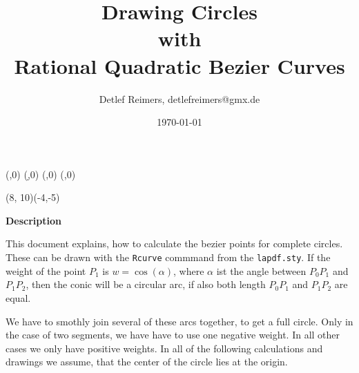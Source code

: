 

\Defdim(\a,0)
\Defdim(\d,0)
\Defdim(\x,0)
\Defdim(\y,0)

\def\Ncirc(#1){\Rad(#1,\a)
 \Cos(\Np\a,\x) \Add(\x,\x)
 \Sin(\Np\a,\y) \Add(\y,\y)
 \Circle(64)(\Np\x,\Np\y,2) \Stroke}

\def\ctitle#1{{\huge\bf{#1}}}

\title{\Huge \bf{Drawing Circles \\
       with \\
       Rational Quadratic Bezier Curves}}
\author{Detlef Reimers, detlefreimers@gmx.de}
\date{\today}


\maketitle

\begin{center}
\begin{lapdf}(8, 10)(-4,-5)
 \Whiledim{\d<360}{\Nextcol(0,23) \Ncirc(\Np\d) \Dadd(\d,15)}
\end{lapdf}

\ctitle{Description}
\end{center}
This document explains, how to calculate the bezier points for
complete circles. These can be drawn with the \texttt{Rcurve}
commmand from the \texttt{lapdf.sty}. If the weight of the point
$P_1$ is $w=\cos(\alpha)$, where $\alpha$ ist the angle between
$P_{0}P_{1}$ and $P_{1}P_{2}$, then the conic will be a circular
arc, if also both length $P_{0}P_{1}$ and $P_{1}P_{2}$ are equal.

We have to smothly join several of these arcs together, to get
a full circle. Only in the case of two segments, we have have to
use one negative weight. In all other cases we only have positive
weights. In all of the following calculations and drawings we assume,
that the center of the circle lies at the origin.

\pagebreak
\parskip0.3cm

